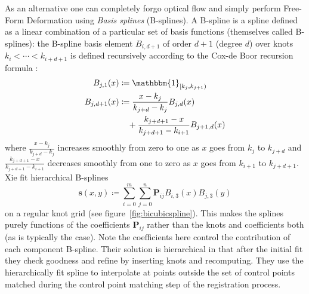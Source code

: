 As an alternative one can completely forgo optical flow and simply perform Free-Form Deformation \cite{xie2004} using \textit{Basis splines} (B-splines).
%
A B-spline is a spline defined as a linear combination of a particular set of basis functions (themselves called B-splines): the B-spline basis element \(B_{i, d+1}\) of order \(d+1\) (degree \(d\)) over knots \(k_i < \cdots < k_{i+d+1}\) is defined recursively according to the Cox-de Boor recursion formula \cite{de1971subroutine}:
\begin{align}
	B_{j,1} (x) &\coloneqq \mathbbm{1}_{[k_j, k_{j+1})} \\
	B_{j,d+1} (x) &\coloneqq \frac{x-k_j}{k_{j+d} - k_j} B_{j,d} (x) \\
	&\quad+ \frac{k_{j+d+1} - x}{k_{j+d+1} - k_{i+1}} B_{j+1,d} \nonumber (x)
\end{align}
where \(\frac{x-k_j}{k_{j+d} - k_j}\) increases smoothly from zero to one as \(x\) goes from \(k_j\) to \(k_{j+d}\) and \(\frac{k_{j+d+1} - x}{k_{j+d+1} - k_{i+1}}\) decreases smoothly from one to zero as \(x\) goes from \(k_{i+1}\) to \(k_{j+d+1}\).
%
Xie \etal \cite{xie2004} fit hierarchical B-splines 
\begin{equation}
	\mathbf{s}(x,y) \coloneqq \sum_{i=0}^m\sum_{j=0}^n \mathbf{P}_{ij} B_{i,3}(x) B_{j,3}(y)
\end{equation}
on a regular knot grid (see figure~\ref{fig:bicubicspline}).
%
This makes the splines purely functions of the coefficients \(\mathbf{P}_{ij}\) rather than the knots and coefficients both (as is typically the case).
%
Note the coefficients here control the contribution of each component B-spline.
%
Their solution is hierarchical in that after the initial fit they check goodness and refine by inserting knots and recomputing.
%
They use the hierarchically fit spline to interpolate at points outside the set of control points matched during the control point matching step of the registration process.
%
